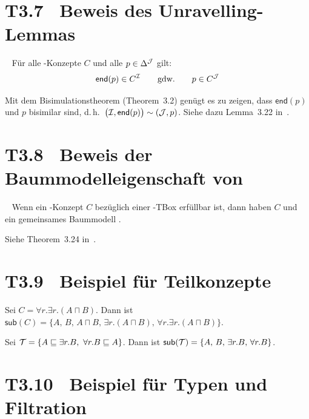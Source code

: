 \documentclass[fontsize=11pt, twoside=false, numbers=autoenddot]{scrbook}
\begin{document}
\goodbreak
\section*{T3.7~ Beweis des Unravelling-Lemmas}

~
Für alle \ALC-Konzepte $C$ und alle $p \in \Delta^\mathcal{J}$ gilt:
\[
  \textsf{end}(p) \in C^\mathcal{I} \qquad\text{gdw.}\qquad p \in C^\mathcal{J}
\]

\par\noindent
\begin{beweis}
  Mit dem Bisimulationstheorem (Theorem~3.2) genügt es zu zeigen,
  dass $\textsf{end}(p)$ und $p$ bisimilar sind,
  d.\,h.\ $\big(\mathcal{I},\textsf{end}(p)\big) \sim (\mathcal{J},p)$.
  Siehe dazu Lemma~3.22 in~\cite{DLintro}.
\end{beweis}

\section*{T3.8~ Beweis der Baummodelleigenschaft von {\boldmath \ALC}}

~
Wenn ein \ALC-Konzept $C$ bezüglich einer \ALC-TBox \Tmc erfüllbar ist,
dann haben $C$ und \Tmc ein gemeinsames Baummodell \Imc.

\par\noindent
\begin{beweis}
  Siehe Theorem~3.24 in~\cite{DLintro}.
\end{beweis}

\section*{T3.9~ Beispiel für Teilkonzepte}

Sei $C = \forall r.\exists r.(A \sqcap B)$.
Dann ist $\textsf{sub}(C) = \{A,\, B,\, A \sqcap B,\, \exists r.(A \sqcap B),\, \forall r.\exists r.(A \sqcap B)\}$.

\parII
Sei $\mathcal{T} = \{A \sqsubseteq \exists r.B,~ \forall r.B \sqsubseteq A\}$.
Dann ist $\textsf{sub}(\mathcal{T}) = \{A,\, B,\, \exists r.B,\, \forall r.B\}$.

\section*{T3.10~ Beispiel für Typen und Filtration}
\end{document}
